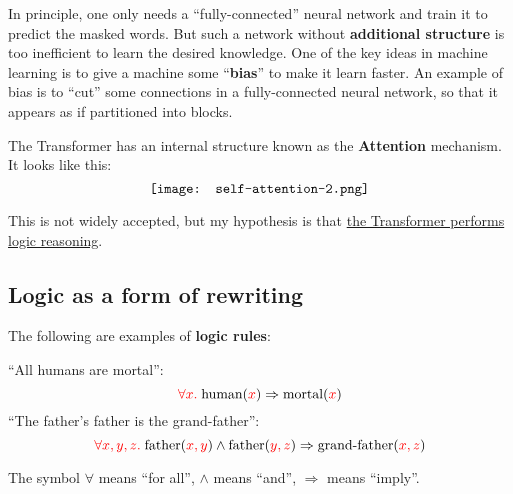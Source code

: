 In principle, one only needs a ``fully-connected'' neural network and train it to predict the masked words.  But such a network without \textbf{additional structure} is too inefficient to learn the desired knowledge.  One of the key ideas in machine learning is to give a machine some ``\textbf{bias}'' to make it learn faster.  An example of bias is to ``cut'' some connections in a fully-connected neural network, so that it appears as if partitioned into blocks.

The Transformer has an internal structure known as the \textbf{Attention} mechanism.  It looks like this:
\begin{equation}
\vcenter{\hbox{\texttt{[image: self-attention-2.png]}}}
\end{equation}

This is not widely accepted, but my hypothesis is that \uline{the Transformer performs logic reasoning}.

\subsection{Logic as a form of rewriting}

The following are examples of \textbf{logic rules}:

``All humans are mortal'':
\begin{equation}
{\color{red}\forall x.} \; \mbox{human}({\color{red}x}) \Rightarrow \mbox{mortal}({\color{red}x}) \\
\end{equation}
``The father's father is the grand-father'':
\begin{equation}
{\color{red}\forall x, y, z.} \; \mbox{father}({\color{red}x,y}) \wedge \mbox{father}({\color{red}y,z}) \Rightarrow \mbox{grand-father}({\color{red}x,z}) 
\end{equation}

The symbol $\forall$ means ``for all'', $\wedge$ means ``and'', $\Rightarrow$ means ``imply''.

